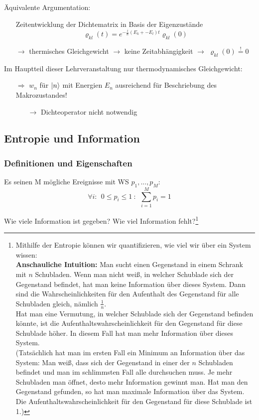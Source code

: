 Äquivalente Argumentation:
\begin{itemize}
    \item[] Zeitentwicklung der Dichtematrix in Basis der Eigenzustände
    \begin{equation}
        \varrho_{kl}(t) =  e^{- \frac{i}{\hbar}(E_k +- E_l)t} \varrho_{kl}(0)
    \end{equation}
    \item[$\rightarrow$] thermisches Gleichgewicht $\rightarrow$ keine Zeitabhängigkeit $\rightarrow$ $\varrho_{kl}(0) \stackrel{!}{=} 0$
\end{itemize}

Im Hauptteil dieser Lehrveranstaltung nur thermodynamisches Gleichgewicht:
\begin{itemize}
    \item[$\Rightarrow$] $w_n$ für $\ket{n}$ mit Energien $E_n$ ausreichend für Beschriebung des Makrozustandes!
    \begin{itemize}
    \item[$\rightarrow$] Dichteoperator nicht notwendig
    \end{itemize}
\end{itemize}

\subsection{Entropie und Information}
\subsubsection{Definitionen und Eigenschaften}
Es seinen M mögliche Ereignisse mit WS $p_1, ..., p_M$:
\begin{equation*}
    \forall i: \ \ 0\leq p_i \leq 1 \ : \ \ \sum_{i=1}^M p_i = 1
\end{equation*}

Wie viele Information ist gegeben? Wie viel Information fehlt?\footnote{Mithilfe der Entropie können wir quantifizieren, wie viel wir über ein System wissen: \\ \textbf{Anschauliche Intuition:} Man sucht einen Gegenstand in einem Schrank mit $n$ Schubladen. Wenn man nicht weiß, in welcher Schublade sich der Gegenstand befindet, hat man keine Information über dieses System. Dann sind die Wahrscheinlichkeiten für den Aufenthalt des Gegenstand für alle Schubladen gleich, nämlich $\frac{1}{n}$. \\
Hat man eine Vermutung, in welcher Schublade sich der Gegenstand befinden könnte, ist die Aufenthaltswahrscheinlichkeit für den Gegenstand für diese Schublade höher. In diesem Fall hat man mehr Information über dieses System. \\
(Tatsächlich hat man im ersten Fall ein Minimum an Information über das System: Man weiß, dass sich der Gegenstand in einer der $n$ Schubladen befindet und man im schlimmsten Fall alle durchsuchen muss. Je mehr Schubladen man öffnet, desto mehr Information gewinnt man. Hat man den Gegenstand gefunden, so hat man maximale Information über das System. Die Aufenthaltswahrscheinlichkeit für den Gegenstand für diese Schublade ist 1.)}
\\

